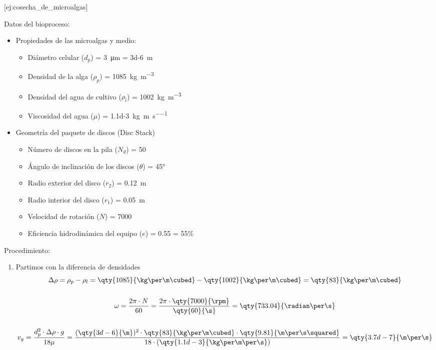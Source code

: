 [ej:cosecha_de_microalgas]{
    Datos del bioproceso:
    \begin{itemize}
    \item Propiedades de las microalgas y medio:
	    \begin{itemize}
	        \item Diámetro celular ($d_{p}$) = \qty{3}{\micro\m} = \qty{3d-6}{\m}
            \item Densidad de la alga ($\rho_{p}$) = \qty{1085}{\kg\per\m\cubed}
            \item Densidad del agua de cultivo ($\rho_{l}$) = \qty{1002}{\kg\per\m\cubed}
            \item Viscosidad del agua ($\mu$) = \qty{1.1d-3}{\kg\per\m\per\s}
	    \end{itemize}
    \item Geometría del paquete de discos (Disc Stack)
	    \begin{itemize}
	        \item Número de discos en la pila ($N_{d}$) = 50
	        \item Ángulo de inclinación de los discos ($\theta$) = 45°
	        \item Radio exterior del disco ($r_{2}$) = \qty{0.12}{\m}
	        \item Radio interior del disco ($r_{1}$) = \qty{0.05}{\m}
	        \item Velocidad de rotación ($N$) = \qty{7000}{\rpm}
	        \item Eficiencia hidrodinámica del equipo ($e$) = 0.55 = 55\%
	    \end{itemize}
	\end{itemize}
	Procedimiento:
    \begin{enumerate}
        \item Partimos con la diferencia de densidades \begin{gather*}
            \Delta\rho = \rho_{p} - \rho_{l} = \qty{1085}{\kg\per\m\cubed} - \qty{1002}{\kg\per\m\cubed} = \qty{83}{\kg\per\m\cubed}
            \\\\
            \omega = \frac{2\pi \cdot N}{60} = \frac{2\pi \cdot \qty{7000}{\rpm}}{\qty{60}{\s}} = \qty{733.04}{\radian\per\s}
            \\\\
            v_{g} = \frac{d_{p}^{2} \cdot \Delta\rho \cdot g}{18\mu} = \frac{(\qty{3d-6}{\m})^{2}\cdot\qty{83}{\kg\per\m\cubed}\cdot\qty{9.81}{\m\per\s\squared}}{18\cdot(\qty{1.1d-3}{\kg\per\m\per\s})} = \qty{3.7d-7}{\m\per\s}

\end{gather*}
\end{enumerate}}
